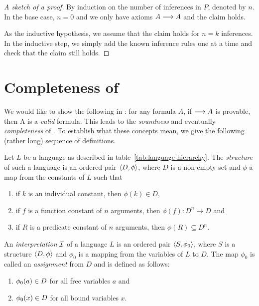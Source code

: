 \documentclass[11pt,a4paper]{article}
\begin{document}
\begin{proof}[A sketch of a proof]
    By induction on the number of inferences in \(P\),
    denoted by \(n\). In the base case, \(n=0\)
    and we only have axioms \(A\longrightarrow A\) and the claim holds.

    As the inductive hypothesis, we assume that the claim holds
    for \(n=k\) inferences. In the inductive step, we simply
    add the known inference rules one at a time and check that
    the claim still holds.
\end{proof}

\section{Completeness of \LK}

We would like to show the following in \LK:
for any formula \(A\), if \(\longrightarrow A\) is provable,
then A is a \emph{valid} formula.
This leads to the \emph{soundness} and eventually \emph{completeness} of \LK.
To establish what these concepts mean, we give the following
(rather long) sequence of definitions.

\begin{definition}\label{def:structure of language}
    Let \(L\) be a language as described in table~\ref{tab:language hierarchy}.
    The \emph{structure} of such a language is an ordered pair \(\langle D,\phi\rangle\),
    where \(D\) is a non-empty set and \(\phi\) a map from the constants of \(L\)
    such that
    \begin{enumerate}
        \item
            if \(k\) is an individual constant, then \(\phi(k)\in D\),
        \item
            if \(f\) is a function constant of \(n\) arguments,
            then \(\phi(f): D^n\to D\) and
        \item
            if \(R\) is a predicate constant of \(n\) arguments,
            then \(\phi(R)\subseteq D^n\).
    \end{enumerate}
\end{definition}

\begin{definition}\label{def:interpretation of language}
    An \emph{interpretation} \(\mathcal{I}\) of a language \(L\) is an ordered pair \(\langle S,\phi_0\rangle\),
    where \(S\) is a structure \(\langle D,\phi\rangle\) and \(\phi_0\)
    is a mapping from the variables of \(L\) to \(D\).
    The map \(\phi_0\) is called an \emph{assignment} from \(D\)
    and is defined as follows:
    \begin{enumerate}
        \item
            \(\phi_0(a)\in D\) for all free variables \(a\) and
        \item
            \(\phi_0(x)\in D\) for all bound variables \(x\).
    \end{enumerate}
\end{definition}
\end{document}
